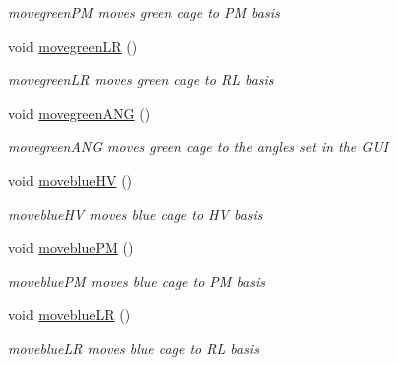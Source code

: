 \begin{DoxyCompactItemize}
\begin{DoxyCompactList}\small\item\em movegreen\+PM moves green cage to PM basis \end{DoxyCompactList}\item 
\mbox{\label{classcagecontrol_aa00c694cc43ef792b86e3cff4907a41d}} 
void \hyperlink{classcagecontrol_aa00c694cc43ef792b86e3cff4907a41d}{movegreen\+LR} ()
\begin{DoxyCompactList}\small\item\em movegreen\+LR moves green cage to RL basis \end{DoxyCompactList}\item 
\mbox{\label{classcagecontrol_a0643d9578dcd3e704093232711e22132}} 
void \hyperlink{classcagecontrol_a0643d9578dcd3e704093232711e22132}{movegreen\+A\+NG} ()
\begin{DoxyCompactList}\small\item\em movegreen\+A\+NG moves green cage to the angles set in the G\+UI \end{DoxyCompactList}\item 
\mbox{\label{classcagecontrol_a195d4aad32491eef569c51f2ba50bb76}} 
void \hyperlink{classcagecontrol_a195d4aad32491eef569c51f2ba50bb76}{moveblue\+HV} ()
\begin{DoxyCompactList}\small\item\em moveblue\+HV moves blue cage to HV basis \end{DoxyCompactList}\item 
\mbox{\label{classcagecontrol_a0930283133bafaff0990c183ac7b99a7}} 
void \hyperlink{classcagecontrol_a0930283133bafaff0990c183ac7b99a7}{moveblue\+PM} ()
\begin{DoxyCompactList}\small\item\em moveblue\+PM moves blue cage to PM basis \end{DoxyCompactList}\item 
\mbox{\label{classcagecontrol_ad51fd091c85c84f4f3fa1e41f14c8840}} 
void \hyperlink{classcagecontrol_ad51fd091c85c84f4f3fa1e41f14c8840}{moveblue\+LR} ()
\begin{DoxyCompactList}\small\item\em moveblue\+LR moves blue cage to RL basis \end{DoxyCompactList}\item 

\end{DoxyCompactItemize}
